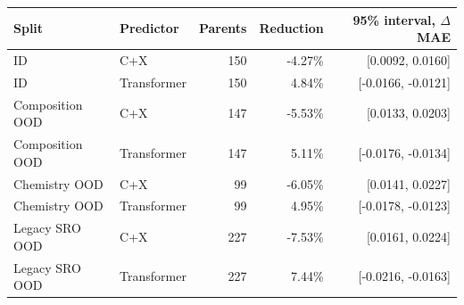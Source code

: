 \small\setlength{\tabcolsep}{5pt}
\begin{tabular}{@{}llrrr@{}}
\toprule
Split & Predictor & Parents & Reduction & 95\% interval, $\Delta$ MAE \\
\midrule
ID & C+X & 150 & -4.27\% & [0.0092, 0.0160] \\
ID & Transformer & 150 & 4.84\% & [-0.0166, -0.0121] \\
Composition OOD & C+X & 147 & -5.53\% & [0.0133, 0.0203] \\
Composition OOD & Transformer & 147 & 5.11\% & [-0.0176, -0.0134] \\
Chemistry OOD & C+X & 99 & -6.05\% & [0.0141, 0.0227] \\
Chemistry OOD & Transformer & 99 & 4.95\% & [-0.0178, -0.0123] \\
Legacy SRO OOD & C+X & 227 & -7.53\% & [0.0161, 0.0224] \\
Legacy SRO OOD & Transformer & 227 & 7.44\% & [-0.0216, -0.0163] \\
\bottomrule
\end{tabular}
